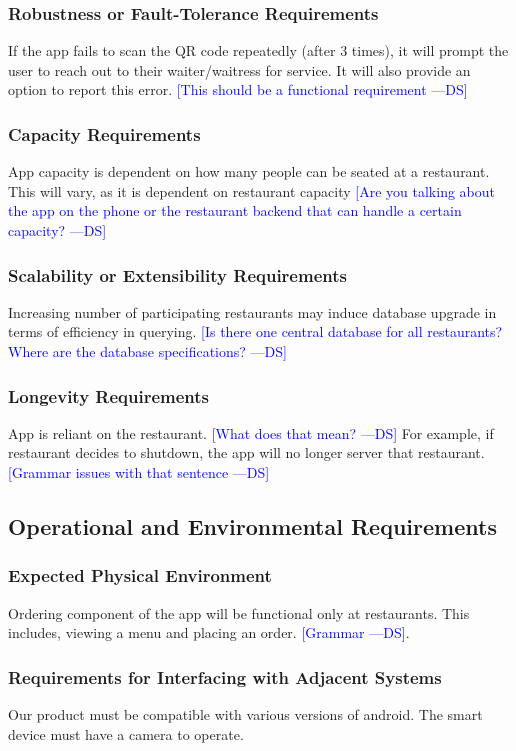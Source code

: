 \documentclass[12pt, titlepage]{article}
\newcommand{\authornote}[3]{\textcolor{#1}{[#3 ---#2]}}
\newcommand{\authornote}[3]{}
\newcommand{\ds}[1]{\authornote{blue}{DS}{#1}}
\begin{document}
\subsubsection{Robustness or Fault-Tolerance Requirements}
If the app fails to scan the QR code repeatedly (after 3 times), it will prompt the user to reach out to their waiter/waitress for service. It will also provide an option to report this error.
\ds{This should be a functional requirement}

\subsubsection{Capacity Requirements}
App capacity is dependent on how many people can be seated at a restaurant. This will vary, as it is dependent on restaurant capacity
\ds{Are you talking about the app on the phone or the restaurant backend that can handle a certain capacity?}

\subsubsection{Scalability or Extensibility Requirements}
Increasing number of participating restaurants may induce database upgrade in terms of efficiency in querying.   
\ds{Is there one central database for all restaurants?
Where are the database specifications?}

\subsubsection{Longevity Requirements}
App is reliant on the restaurant. \ds{What does that mean?} For example, if restaurant decides to shutdown, the app will no longer server that restaurant.\ds{Grammar issues with that sentence}

\subsection{Operational and Environmental Requirements}
\subsubsection{Expected Physical Environment}
Ordering component of the app will be functional only at restaurants. This includes, viewing a menu and placing an order. \ds{Grammar}.

\subsubsection{Requirements for Interfacing with Adjacent Systems}
Our product must be compatible with various versions of android. The smart device must have a camera to operate.
\end{document}

